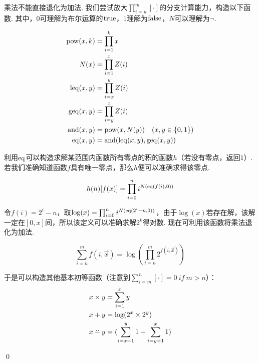 \begin{pf} \rm 乘法不能直接退化为加法. 我们尝试放大$\displaystyle \prod^m_{i=n}[\cdot]$的分支计算能力，构造以下函数. 其中，$0$可理解为布尔运算的$\mathrm{true}$，$1$理解为$\mathrm{false}$，$N$可以理解为$\neg$.

$$
\begin{aligned}
\mathrm{pow}(x,k)&=\prod^{k}_{i=1}x\\
N(x)&=\prod_{i=1}^x Z(i)\\
\mathrm{leq}(x,y)&=\prod^{y}_{i=x}Z(i)\\
\mathrm{geq}(x,y)&=\prod^{x}_{i=y}Z(i)\\
\mathrm{and}(x,y)&=\mathrm{pow}(x, N(y))\quad(x,y\in\{0,1\})\\
\mathrm{eq}(x,y)&=\mathrm{and}(\mathrm{leq}(x,y), \mathrm{geq}(x,y))\\
\end{aligned}
$$

利用$\mathrm{eq}$可以构造求解某范围内函数所有零点的积的函数$h$（若没有零点，返回$1$）. 若我们准确知道函数$f$具有唯一零点，那么$h$便可以准确求得该零点.

$$
h(n)[f(x)] = \prod^{n}_{i=0}i^{N(\mathrm{eq}(f(i), 0))}
$$

令$f(i)=2^{i}-n$，取$\log(x)=\prod^{n}_{i=0}i^{N(\mathrm{eq}(2^i-n, 0))}$，由于$\log(x)$若存在解，该解一定在$[0,x]$间，所以该定义可以准确求解$2^k$得对数. 现在可利用该函数将乘法退化为加法.

$$
\sum_{i=n}^m f(i,\vec{x}) = \log(\prod_{i=n}^m 2^{f(i,\vec{x})})
$$

于是可以构造其他基本初等函数（注意到$\displaystyle\sum_{i=m}^n[\cdot]=0\ \textit{if}\ m>n$）：
$$
\begin{aligned}
    x \times y &= \sum_{i=1}^x y \\
    x + y &= \log(2^x\times 2^y) \\
    x\dotdotminus y &= (\sum_{i=x+1}^y 1 + \sum_{i=y+1}^x 1)\\
\end{aligned}
$$

    \qed
\end{pf}
